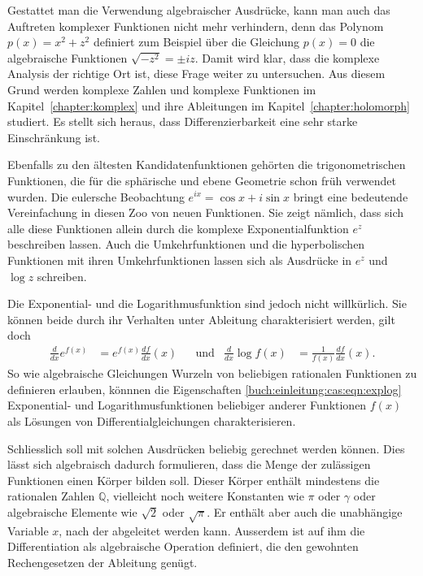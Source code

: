 Gestattet man die Verwendung algebraischer Ausdrücke, kann man auch
das Auftreten komplexer Funktionen nicht mehr verhindern, denn
das Polynom $p(x) = x^2 + z^2$ definiert zum Beispiel über die Gleichung
$p(x)=0$ die algebraische Funktionen $\sqrt{-z^2}=\pm iz$.
Damit wird klar, dass die komplexe Analysis der richtige Ort ist, diese
Frage weiter zu untersuchen.
Aus diesem Grund werden komplexe Zahlen und komplexe Funktionen im
Kapitel~\ref{chapter:komplex} und ihre Ableitungen im
Kapitel~\ref{chapter:holomorph} studiert.
Es stellt sich heraus, dass Differenzierbarkeit eine sehr starke
Einschränkung ist.

Ebenfalls zu den ältesten Kandidatenfunktionen gehörten die
trigonometrischen Funktionen, die für die sphärische und
ebene Geometrie schon früh verwendet wurden.
%
%
Die eulersche Beobachtung $e^{ix}=\cos x + i\sin x$ bringt 
eine bedeutende Vereinfachung in diesen Zoo von neuen Funktionen.
Sie zeigt nämlich, dass sich alle diese Funktionen allein durch
die komplexe Exponentialfunktion $e^z$ beschreiben lassen.
%
Auch die Umkehrfunktionen und die hyperbolischen Funktionen mit
%
ihren Umkehrfunktionen lassen sich als Ausdrücke in $e^z$ und $\log z$
schreiben.

Die Exponential- und die Logarithmusfunktion sind jedoch nicht willkürlich.
Sie können beide durch ihr Verhalten unter Ableitung charakterisiert
werden, gilt doch
\begin{align}
\frac{d}{dx}e^{f(x)} &= e^{f(x)}\frac{df}{dx}(x)
&&\text{und}&
\frac{d}{dx}\log f(x) &= \frac{1}{f(x)}\frac{df}{dx}(x).
\label{buch:einleitung:cas:eqn:explog}
\end{align}
So wie algebraische Gleichungen Wurzeln von beliebigen rationalen
Funktionen zu definieren erlauben, könnnen die Eigenschaften
\eqref{buch:einleitung:cas:eqn:explog}
Exponential- und Logarithmusfunktionen beliebiger anderer Funktionen
$f(x)$ als Lösungen von Differentialgleichungen charakterisieren.

Schliesslich soll mit solchen Ausdrücken beliebig gerechnet werden
können.
Dies lässt sich algebraisch dadurch formulieren, dass die Menge der
zulässigen Funktionen einen Körper bilden soll.
%
Dieser Körper enthält mindestens die rationalen Zahlen $\mathbb{Q}$,
%
vielleicht noch weitere Konstanten wie $\pi$ oder $\gamma$ oder algebraische
Elemente wie $\!\sqrt{2}$ oder $\!\sqrt{\pi}$.
%
%
%
Er enthält aber auch die unabhängige Variable $x$, nach der abgeleitet
werden kann.
Ausserdem ist auf ihm die Differentiation als algebraische Operation
definiert, die den gewohnten Rechengesetzen der Ableitung genügt.

